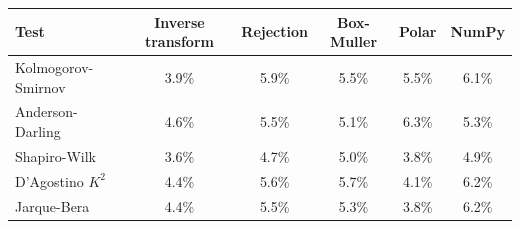 \begin{tabular}{lccccc}
\toprule
Test & Inverse transform & Rejection & Box-Muller & Polar & NumPy \\
\midrule
Kolmogorov-Smirnov & 3.9\% & 5.9\% & 5.5\% & 5.5\% & 6.1\% \\
Anderson-Darling & 4.6\% & 5.5\% & 5.1\% & 6.3\% & 5.3\% \\
Shapiro-Wilk & 3.6\% & 4.7\% & 5.0\% & 3.8\% & 4.9\% \\
D'Agostino $K^2$ & 4.4\% & 5.6\% & 5.7\% & 4.1\% & 6.2\% \\
Jarque-Bera & 4.4\% & 5.5\% & 5.3\% & 3.8\% & 6.2\% \\
\bottomrule
\end{tabular}

